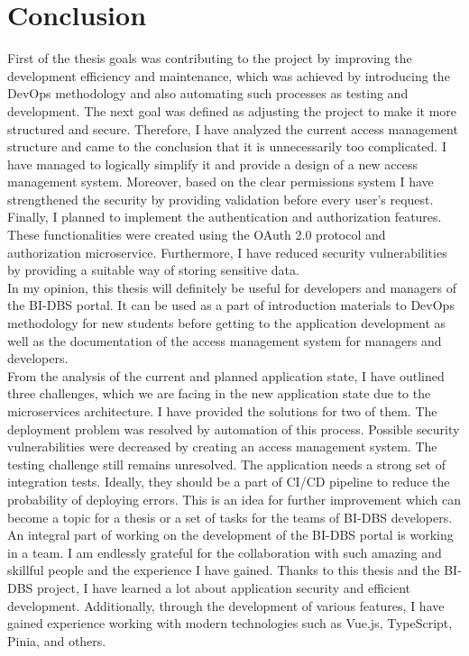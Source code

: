 \chapter{Conclusion} First of the thesis goals was contributing to the project by improving the development efficiency and maintenance, which was achieved by introducing the DevOps methodology and also automating such processes as testing and development. The next goal was defined as adjusting the project to make it more structured and secure. Therefore, I have analyzed the current access management structure and came to the conclusion that it is unnecessarily too complicated. I have managed to logically simplify it and provide a design of a new access management system. Moreover, based on the clear permissions system I have strengthened the security by providing validation before every user's request. Finally, I planned to implement the authentication and authorization features. These functionalities were created using the OAuth 2.0 protocol and authorization microservice. Furthermore, I have reduced security vulnerabilities by providing a suitable way of storing sensitive data.\\
In my opinion, this thesis will definitely be useful for developers and managers of the BI-DBS portal. It can be used as a part of introduction materials to DevOps methodology for new students before getting to the application development as well as the documentation of the access management system for managers and developers.\\
From the analysis of the current and planned application state, I have outlined three challenges, which we are facing in the new application state due to the microservices architecture. I have provided the solutions for two of them. The deployment problem was resolved by automation of this process. Possible security vulnerabilities were decreased by creating an access management system. The testing challenge still remains unresolved. The application needs a strong set of integration tests. Ideally, they should be a part of CI/CD pipeline to reduce the probability of deploying errors. This is an idea for further improvement which can become a topic for a thesis or a set of tasks for the teams of BI-DBS developers.\\
An integral part of working on the development of the BI-DBS portal is working in a team. I am endlessly grateful for the collaboration with such amazing and skillful people and the experience I have gained. Thanks to this thesis and the BI-DBS project, I have learned a lot about application security and efficient development. Additionally, through the development of various features, I have gained experience working with modern technologies such as Vue.js, TypeScript, Pinia, and others.